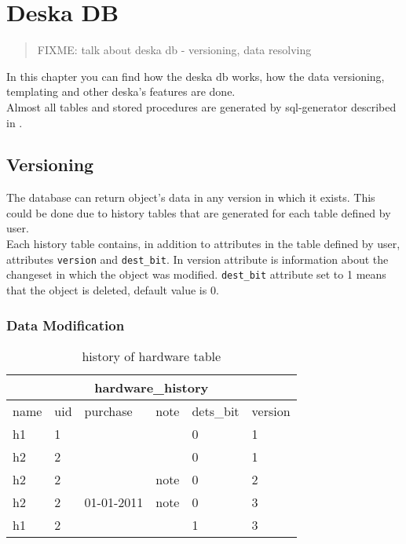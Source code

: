 \documentclass[deska]{subfiles}
\begin{document}
\chapter{Deska DB}
\label{sec:deksa-db}

\begin{abstract}
FIXME: talk about deska db - versioning, data resolving
\end{abstract}

In this chapter you can find how the deska db works, how the data versioning, templating and other deska's features are done.\\
Almost all tables and stored procedures are generated by sql-generator described in .

\section{Versioning}
The database can return object's data in any version in which it exists. This could be done due to history tables that are generated for each table defined by user.\\
Each history table contains, in addition to attributes in the table defined by user, attributes {\tt version} and {\tt dest\_bit}. In version attribute is information about the changeset in which the object was modified. {\tt dest\_bit} attribute set to 1 means that the object is deleted, default value is 0.\\

\subsection{Data Modification}
\begin{center}

\begin{table}
    \caption{history of hardware table}
    \label{tab-example-hardwarehist}
\begin{tabular}{ | l | l | l | l | l | l |}
    \hline
    \multicolumn{6}{|c|}{hardware\_history}\\
    \hline
    name & uid & purchase & note & dets\_bit & version\\
    \hline
    h1 & 1 & & & 0 & 1 \\
    h2 & 2 & & & 0 & 1 \\
    h2 & 2 & & note & 0 & 2 \\
    h2 & 2 & 01-01-2011 & note & 0 & 3 \\
    h1 & 2 & & & 1 & 3 \\
    \hline
\end{tabular}
\end{table}

\end{center}
\end{document}
